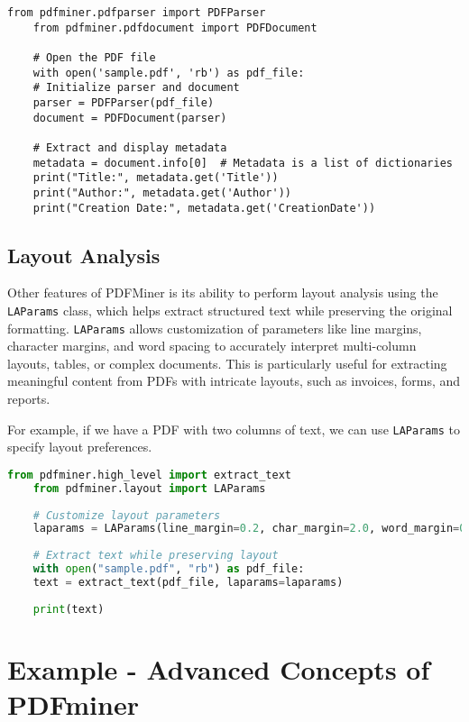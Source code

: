 \begin{lstlisting}[caption={Extracting PDF Metadata with pdfminer.six}, label={lst:extract_pdf_metadata}]
	from pdfminer.pdfparser import PDFParser
	from pdfminer.pdfdocument import PDFDocument
	
	# Open the PDF file
	with open('sample.pdf', 'rb') as pdf_file:
	# Initialize parser and document
	parser = PDFParser(pdf_file)
	document = PDFDocument(parser)
	
	# Extract and display metadata
	metadata = document.info[0]  # Metadata is a list of dictionaries
	print("Title:", metadata.get('Title'))
	print("Author:", metadata.get('Author'))
	print("Creation Date:", metadata.get('CreationDate'))
\end{lstlisting}

\subsection{Layout Analysis}
Other features of PDFMiner is its ability to perform layout analysis using the \texttt{LAParams} class, which helps extract structured text while preserving the original formatting. \texttt{LAParams} allows customization of parameters like line margins, character margins, and word spacing to accurately interpret multi-column layouts, tables, or complex documents. This is particularly useful for extracting meaningful content from PDFs with intricate layouts, such as invoices, forms, and reports.

For example, if we have a PDF with two columns of text, we can use \texttt{LAParams} to specify layout preferences.

\begin{lstlisting}[language=Python, caption=Using LAParams for Layout Analysis]
	from pdfminer.high_level import extract_text
	from pdfminer.layout import LAParams
	
	# Customize layout parameters
	laparams = LAParams(line_margin=0.2, char_margin=2.0, word_margin=0.1)
	
	# Extract text while preserving layout
	with open("sample.pdf", "rb") as pdf_file:
	text = extract_text(pdf_file, laparams=laparams)
	
	print(text)
\end{lstlisting}

\section{Example - Advanced Concepts of PDFminer}

